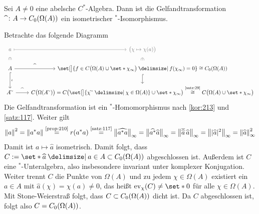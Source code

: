 \begin{satz}[name={Gelfand},label=satz16:gelfand]
	Sei $A \neq 0$ eine abelsche $C^*$-Algebra. 
	Dann ist die Gelfandtransformation $\widehat{\hspace{5pt}} \colon A \to C_0 \enbrace*{\Omega(A)}$ ein isometrischer ${}^*$-Isomorphismus.
\end{satz}
\begin{beweis}
	Betrachte das folgende Diagramm
	\[
		\begin{tikzcd}
			\color{dark_gray} a \rar[mapsto,dark_gray] \dar[phantom,"\in",sloped,dark_gray] & \color{dark_gray} \enbrace[\big]{\chi \mapsto \chi(a)} \dar[phantom,"\in",sloped,dark_gray] \\[-2pt]
			A \dar[hook,"\iota"] \rar["\widehat{\hspace{1ex}}"] 
			& \set[\big]{f \in C \enbrace[\big]{\Omega(A) \cup\set*{\chi_\infty}}\given f(\chi_\infty)=0} \cong C_0\enbrace*{\Omega(A)} \dar[hook] \\
			A^\simm \rar["\widehat{\hspace{1ex}}"] & C \enbrace[\big]{\Omega(A^\simm)} = C \enbrace[\big]{ \set[\big]{\chi^\simm \given \chi \in \Omega(A)} \cup \set*{\chi_\infty}} 
			\StackText{\ref{satz:29}}{\cong} C \enbrace[\big]{\Omega(A) \cup \set*{\chi_\infty}} 
		\end{tikzcd}
	\]
	Die Gelfandtransformation ist ein ${}^*$-Homomorphismus nach \autoref{kor:213} und \autoref{satz:117}. Weiter gilt 
	\[
		\norm*{a}^2 = \norm*{a^*a} \StackText{\ref{prop:210}}{=} r(a^*a) \StackText{\ref{satz:117}}{=} \norm[\big]{\widehat{a^*a}}_\infty = \norm*{\widehat{a^*} \widehat{a}}_\infty
		= \norm[\big]{\overline{\widehat{a}} \,\widehat{a}}_\infty = \norm[\big]{\abs{\widehat{a}}^2 }_\infty = \norm*{\widehat{a}}^2_\infty
	\]
	Damit ist $a \mapsto \widehat{a}$ isometrisch. 
	Damit folgt, dass $C := \set*{\widehat{a} \given a \in A} \subset C_0 \enbrace*{\Omega(A)}$ abgeschlossen ist. 
	Außerdem ist $C$ eine ${}^*$-Unteralgebra, also insbesondere invariant unter komplexer Konjugation. 
	Weiter trennt $C$ die Punkte von $\Omega(A)$ und zu jedem $\chi \in \Omega(A)$ existiert ein $a \in A$ mit $\widehat{a}(\chi)= \chi(a) \neq 0$, das heißt $\ev_\chi(C) \neq \set*{0}$ für alle $\chi \in \Omega(A)$. 
	Mit Stone-Weierstraß folgt, dass $C \subset C_0 \enbrace*{\Omega(A)}$ dicht ist. 
	Da $C$ abgeschlossen ist, folgt also $C=C_0 \enbrace*{\Omega(A)}$.
\end{beweis}

